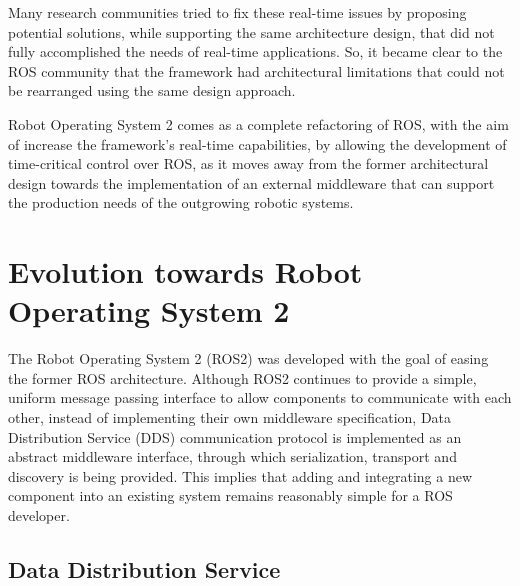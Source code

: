 Many research communities tried to fix these real-time issues by proposing potential solutions, while supporting the same architecture design, that did not fully accomplished the needs of real-time applications. So, it became clear to the ROS community that the framework had architectural limitations that could not be rearranged using the same design approach. \cite{maruyama2016exploring}

Robot Operating System 2 comes as a complete refactoring of ROS, with the aim of increase the framework's real-time capabilities, by allowing the development of time-critical control over ROS, as it moves away from the former architectural design towards the implementation of an external middleware that can support the production needs of the outgrowing robotic systems. \cite{kim2018security, casini2019response}


\section{Evolution towards Robot Operating System 2}

The Robot Operating System 2 (ROS2) was developed with the goal of easing the former ROS architecture. Although ROS2 continues to provide a simple, uniform message passing interface to allow components to communicate with each other, instead of implementing their own middleware specification, Data Distribution Service (DDS) communication protocol is implemented as an abstract middleware interface, through which serialization, transport and discovery is being provided. This implies that adding and integrating a new component into an existing system remains reasonably simple for a ROS developer.

\subsection{Data Distribution Service}

